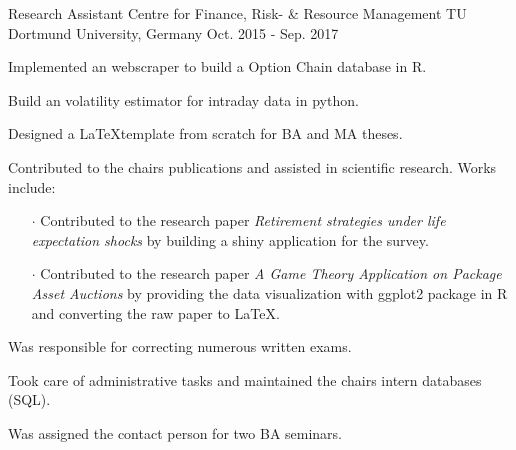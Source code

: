 \begin{cventries}
\cventry
{Research Assistant} %
{Centre for Finance, Risk- \& Resource Management} %
{TU Dortmund University, Germany} %
{Oct. 2015 - Sep. 2017} %
{
  \begin{cvitems} %
    \item {Implemented an webscraper to build a Option Chain database in R.}
    \item {Build an volatility estimator for intraday data in python.}
    \item {Designed a \LaTeX template from scratch for BA and MA theses.}
    \item {Contributed to the chairs publications and assisted in scientific research. Works include: \begin{itemize}
      \item[$\cdot$] Contributed to the research paper \textit{Retirement strategies under life expectation shocks} by building a shiny application for the survey.
      \item[$\cdot$] Contributed to the research paper \textit{A Game Theory Application on Package Asset Auctions} by providing the data visualization with ggplot2 package in R and converting the raw paper to \LaTeX{}.
    \end{itemize}
    }
    \item {Was responsible for correcting numerous written exams.}
    \item {Took care of administrative tasks and maintained the chairs intern databases (SQL).}
    \item {Was assigned the contact person for two BA seminars.}
  \end{cvitems}
}

\end{cventries}
